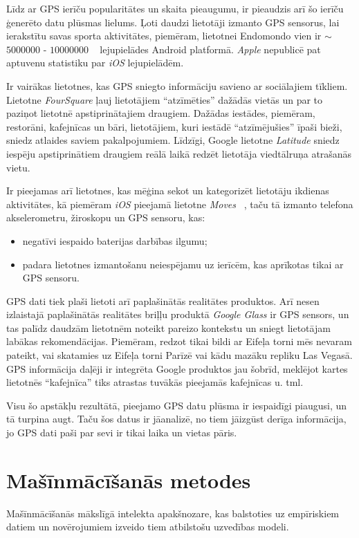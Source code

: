 \documentclass{ludis}
\begin{document}
Līdz ar GPS ierīču popularitātes un skaita pieaugumu, ir pieaudzis arī šo ierīču ģenerēto datu
plūsmas lielums. Ļoti daudzi lietotāji izmanto GPS sensorus, lai ierakstītu savas sporta aktivitātes,
piemēram, lietotnei Endomondo vien ir $\sim$ $5000000$ - $10000000$ ~\cite{g_play_endomondo} 
lejupielādes Android platformā. \emph{Apple} nepublicē pat aptuvenu statistiku par \emph{iOS}
lejupielādēm.

Ir vairākas lietotnes, kas GPS sniegto informāciju savieno ar sociālajiem tīkliem. Lietotne 
\emph{FourSquare} ļauj lietotājiem ``atzīmēties'' dažādās vietās un par to paziņot lietotnē
apstiprinātajiem draugiem. Dažādas iestādes, piemēram, restorāni, kafejnīcas un bāri, lietotājiem, 
kuri iestādē ``atzīmējušies'' īpaši bieži, sniedz atlaides saviem pakalpojumiem. Līdzīgi,
Google lietotne \emph{Latitude} sniedz iespēju apstiprinātiem draugiem reālā laikā redzēt
lietotāja viedtālruņa atrašanās vietu.

Ir pieejamas arī lietotnes, kas mēģina sekot un kategorizēt lietotāju ikdienas 
aktivitātes, kā piemēram \emph{iOS} pieejamā lietotne \emph{Moves} ~\cite{moves_app}, taču tā 
izmanto telefona akselerometru, žiroskopu un GPS sensoru, kas:
\begin{itemize}
\item negatīvi iespaido baterijas darbības ilgumu;
\item padara lietotnes izmantošanu neiespējamu uz ierīcēm, kas aprīkotas tikai ar GPS sensoru.
\end{itemize}

GPS dati tiek plaši lietoti arī paplašinātās realitātes produktos. Arī nesen izlaistajā paplašinātās
realitātes briļļu produktā \emph{Google Glass} ir GPS sensors, un tas palīdz daudzām lietotnēm
noteikt pareizo kontekstu un sniegt lietotājam labākas rekomendācijas. Piemēram, redzot tikai bildi
ar Eifeļa torni mēs nevaram pateikt, vai skatamies uz Eifeļa torni Parīzē vai kādu mazāku repliku
Las Vegasā. GPS informācija daļēji ir integrēta Google produktos jau šobrīd, meklējot kartes
lietotnēs ``kafejnīca'' tiks atrastas tuvākās pieejamās kafejnīcas u. tml.

Visu šo apstākļu rezultātā, pieejamo GPS datu plūsma ir iespaidīgi piaugusi, un tā turpina augt.
Taču šos datus ir jāanalizē, no tiem jāizgūst derīga informācija, jo GPS dati paši par sevi ir
tikai laika un vietas pāris.

\section{Mašīnmācīšanās metodes}
Mašīnmācīšanās mākslīgā intelekta apakšnozare, kas balstoties uz empīriskiem datiem un novērojumiem
izveido tiem atbilstošu uzvedības modeli. 
\end{document}
